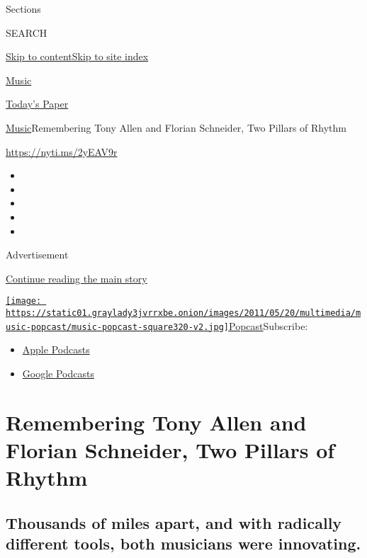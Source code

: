 Sections

SEARCH

\protect\hyperlink{site-content}{Skip to
content}\protect\hyperlink{site-index}{Skip to site index}

\href{https://www.nytimes3xbfgragh.onion/section/arts/music}{Music}

\href{https://myaccount.nytimes3xbfgragh.onion/auth/login?response_type=cookie\&client_id=vi}{}

\href{https://www.nytimes3xbfgragh.onion/section/todayspaper}{Today's
Paper}

\href{/section/arts/music}{Music}\textbar{}Remembering Tony Allen and
Florian Schneider, Two Pillars of Rhythm

\url{https://nyti.ms/2yEAV9r}

\begin{itemize}
\item
\item
\item
\item
\item
\end{itemize}

Advertisement

\protect\hyperlink{after-top}{Continue reading the main story}

\href{https://www.nytimes3xbfgragh.onion/column/popcast-pop-music-podcast}{\texttt{[image: https://static01.graylady3jvrrxbe.onion/images/2011/05/20/multimedia/music-popcast/music-popcast-square320-v2.jpg]}Popcast}Subscribe:

\begin{itemize}
\tightlist
\item
  \href{https://itunes.apple.com/us/podcast/id120315823}{Apple Podcasts}
\item
  \href{https://play.google.com/music/listen?u=0\#/ps/Izaidkcp4ffluag7z7wuzica2su}{Google
  Podcasts}
\end{itemize}

\hypertarget{remembering-tony-allen-and-florian-schneider-two-pillars-of-rhythm}{%
\section{Remembering Tony Allen and Florian Schneider, Two Pillars of
Rhythm}\label{remembering-tony-allen-and-florian-schneider-two-pillars-of-rhythm}}

\hypertarget{thousands-of-miles-apart-and-with-radically-different-tools-both-musicians-were-innovating}{%
\subsection{Thousands of miles apart, and with radically different
tools, both musicians were
innovating.}\label{thousands-of-miles-apart-and-with-radically-different-tools-both-musicians-were-innovating}}

